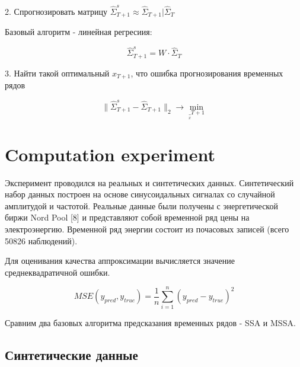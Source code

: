 \documentclass{article}
\begin{document}
2. Спрогнозировать матрицу $\hat{\Sigma}_{T+1}^s \approx \hat{\Sigma}_{T+1} | \hat{\Sigma}_{T}$

Базовый алгоритм - линейная регресиия:

\begin{equation}
\hat{\Sigma}_{T+1}^s = W \cdot \hat{\Sigma}_{T}
\end{equation}


3. Найти такой оптимальный $x_{T+1}$, что ошибка прогнозирования временных рядов

\begin{equation}
    \| \hat{\Sigma}_{T+1}^s - \hat{\Sigma}_{T+1} \|_2 \to \min_{\underset x_{T+1}}
\end{equation}






\section{Computation experiment}

Эксперимент проводился на реальных и синтетических данных. Синтетический набор данных построен на основе синусоидальных сигналах со случайной амплитудой и частотой. Реальные данные были получены с энергетической биржи Nord Pool [8] и представляют собой временной ряд цены на электроэнергию. Временной ряд энергии состоит из почасовых записей (всего 50826 наблюдений). 

Для оценивания качества аппроксимации вычисляется значение среднеквадратичной ошибки.

\begin{equation}
MSE(y_{pred}, y_{true}) = \frac{1}{n} \sum_{i=1}^n (y_{pred} - y_{true})^2
\end{equation}

Сравним два базовых алгоритма предсказания временных рядов - SSA и MSSA.

\subsection{Синтетические данные}
\end{document}
